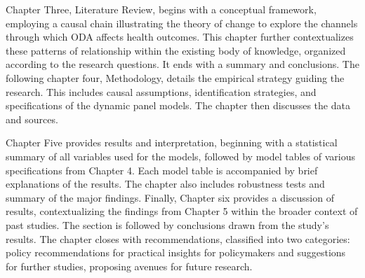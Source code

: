 Chapter Three, Literature Review, begins with a conceptual framework, employing a causal chain illustrating the theory of change to explore the channels through which ODA affects health outcomes. This chapter further contextualizes these patterns of relationship within the existing body of knowledge, organized according to the research questions. It ends with a summary and conclusions. The following chapter four, Methodology, details the empirical strategy guiding the research. This includes causal assumptions, identification strategies, and specifications of the dynamic panel models. The chapter then discusses the data and sources.

Chapter Five provides results and interpretation, beginning with a statistical summary of all variables used for the models, followed by model tables of various specifications from Chapter 4. Each model table is accompanied by brief explanations of the results. The chapter also includes robustness tests and summary of the major findings. Finally, Chapter six provides a discussion of results, contextualizing the findings from Chapter 5 within the broader context of past studies. The section is followed by conclusions drawn from the study’s results. The chapter closes with recommendations, classified into two categories: policy recommendations for practical insights for policymakers and suggestions for further studies, proposing avenues for future research.

